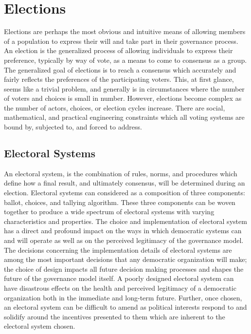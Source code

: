 \section{Elections}\label{sec:elections}
Elections are perhaps the most obvious and intuitive means of allowing members
of a population to express their will and take part in their governance process.
An election is the generalized process of allowing individuals to express their
preference, typically by way of vote, as a means to come to consensus as a
group. The generalized goal of elections is to reach a consensus which
accurately and fairly reflects the preferences of the participating voters.
This, at first glance, seems like a trivial problem, and generally is in
circumstances where the number of voters and choices is small in number.
However, elections become complex as the number of actors, choices, or election
cycles increase. There are social, mathematical, and practical engineering
constraints which all voting systems are bound by, subjected to, and forced to
address.


\subsection*{Electoral Systems}
An electoral system, is the combination of rules, norms, and procedures which
define how a final result, and ultimately consensus, will be determined during
an election. Electoral systems can considered as a composition of three
components: ballot, choices, and tallying algorithm. These three components can
be woven together to produce a wide spectrum of electoral systems with varying
characteristics and properties. The choice and implementation of electoral
system has a direct and profound impact on the ways in which democratic systems
can and will operate as well as on the perceived legitimacy of the governance
model. The decisions concerning the implementation details of electoral systems
are among the most important decisions that any democratic organization will
make; the choice of design impacts all future decision making processes and
shapes the future of the governance model itself. A poorly designed electoral
system can have disastrous effects on the health and perceived legitimacy of a
democratic organization both in the immediate and long-term future. Further,
once chosen, an electoral system can be difficult to amend as political
interests respond to and solidify around the incentives presented to them which
are inherent to the electoral system chosen.\cite{electoral-handbook}

